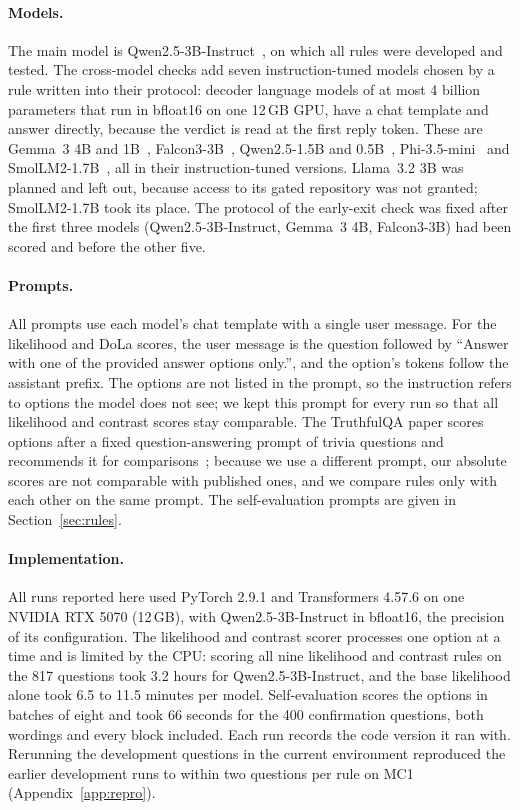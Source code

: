 \documentclass[11pt]{article}
\newcommand{\mainmodel}{Qwen2.5-3B-Instruct}
\begin{document}
\paragraph{Models.}
The main model is \mainmodel{}~\citep{qwen2024qwen25}, on which all rules were developed and tested. The
cross-model checks add seven instruction-tuned models chosen by a rule written into their protocol: decoder language models
of at most 4 billion parameters that run in bfloat16 on one 12\,GB GPU, have a chat template and answer directly,
because the verdict is read at the first reply token. These are Gemma~3 4B and 1B~\citep{gemmateam2025gemma3},
Falcon3-3B~\citep{tii2024falcon3}, Qwen2.5-1.5B and 0.5B~\citep{qwen2024qwen25},
Phi-3.5-mini~\citep{abdin2024phi3} and SmolLM2-1.7B~\citep{benallal2025smollm2}, all in their instruction-tuned
versions. Llama~3.2 3B was planned and left out, because access to its gated repository was not granted;
SmolLM2-1.7B took its place. The protocol of the early-exit check was fixed after the first three models
(\mainmodel{}, Gemma~3 4B, Falcon3-3B) had been scored and before the other five.

\paragraph{Prompts.}
All prompts use each model's chat template with a single user message. For the likelihood and DoLa scores, the
user message is the question followed by ``Answer with one of the provided answer options only.'', and the
option's tokens follow the assistant prefix. The options are not listed in the prompt, so the instruction refers
to options the model does not see; we kept this prompt for every run so that all likelihood and contrast scores stay
comparable. The TruthfulQA paper scores options after a fixed question-answering prompt of trivia questions and
recommends it for comparisons~\citep{lin2022truthfulqa}; because we use a different prompt, our absolute scores are
not comparable with published ones, and we compare rules only with each other on the same prompt. The
self-evaluation prompts are given in Section~\ref{sec:rules}.

\paragraph{Implementation.}
All runs reported here used PyTorch 2.9.1 and Transformers 4.57.6 on one NVIDIA RTX 5070 (12\,GB), with \mainmodel{} in bfloat16,
the precision of its configuration. The likelihood and contrast scorer processes one option at a time and is limited
by the CPU: scoring all nine likelihood and contrast rules on the 817 questions took 3.2 hours for \mainmodel{}, and
the base likelihood alone took 6.5 to 11.5 minutes per model. Self-evaluation scores the options in batches of
eight and took 66 seconds for the 400 confirmation questions, both wordings and every block included. Each run
records the code version it ran with. Rerunning the development questions in the current environment reproduced
the earlier development runs to within two questions per rule on MC1 (Appendix~\ref{app:repro}).
\end{document}
